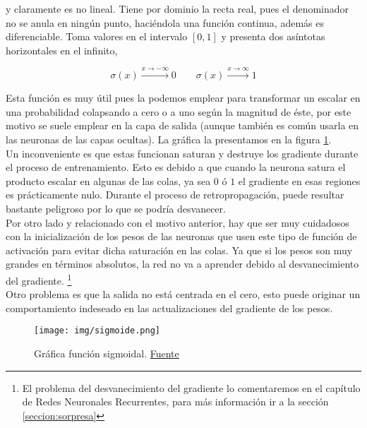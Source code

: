         \noindent y claramente es no lineal. Tiene por dominio la recta real, pues el denominador no se anula en ningún punto, haciéndola una función continua, además es diferenciable. Toma valores en el intervalo $[0,1]$ y presenta dos asíntotas horizontales en el infinito,
        
        \begin{equation}
            \sigma(x) \overset{x \to -\infty}{\longrightarrow}  0 \qquad  \sigma(x)\overset{x \to \infty}{\longrightarrow}  1
        \end{equation}
        
        Esta función es muy útil pues la podemos emplear para transformar un escalar en una probabilidad colapsando a cero o a uno según la magnitud de éste, por este motivo se suele emplear en la capa de salida (aunque también es común usarla en las neuronas de las capas ocultas). La gráfica la presentamos en la figura \ref{fig:grafica sigmoidal}. \\
        
        Un inconveniente es que estas funcionan saturan y destruye los gradiente durante el proceso de entrenamiento. Esto es debido a que cuando la neurona satura el producto escalar en algunas de las colas, ya sea $0$ ó $1$ el gradiente en esas regiones es prácticamente nulo. Durante el proceso de retropropagación, puede resultar bastante peligroso por lo que se podría desvanecer. \\
        
        Por otro lado y relacionado con el motivo anterior, hay que ser muy cuidadosos con la inicialización de los pesos de las neuronas que usen este tipo de función de activación para evitar dicha saturación en las colas. Ya que si los pesos son muy grandes en términos absolutos, la red no va a aprender debido al desvanecimiento del gradiente. \footnote{El problema del desvanecimiento del gradiente lo comentaremos en el capítulo de Redes Neuronales Recurrentes, para más información ir a la sección \ref{seccion:sorpresa}} \\
        
        Otro problema es que la salida no está centrada en el cero, esto puede originar un comportamiento indeseado en las actualizaciones del gradiente de los pesos. \\
        
        \begin{figure}[H]
            \centering
            \texttt{[image: img/sigmoide.png]}
            \caption{Gráfica función sigmoidal. \href{https://ml4a.github.io/images/figures/sigmoid.png}{Fuente}}
            \label{fig:grafica sigmoidal}
        \end{figure}
        
